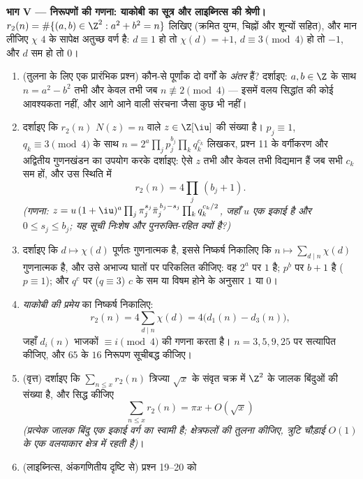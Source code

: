 \begin{problem}[{सप्ताहांत समस्या --- दो वर्गों के योग, $\Z[\iu]$ के
माध्यम से}]
\medskip
\noindent\textbf{भाग V --- निरूपणों की गणना: याकोबी का सूत्र और
लाइब्नित्स की श्रेणी।} $r_2(n) = \#\{(a, b) \in
\Z^2 : a^2 + b^2 = n\}$ लिखिए (क्रमित युग्म, चिह्नों और
शून्यों सहित), और मान लीजिए $\chi$ $4$ के सापेक्ष अतुच्छ वर्ण
है: $d \equiv 1$ हो तो $\chi(d) = +1$, $d \equiv 3 \pmod4$ हो तो $-1$, और $d$ सम हो तो
$0$।
\begin{enumerate}[resume]
  \item (तुलना के लिए एक प्रारंभिक प्रश्न) कौन-से पूर्णांक दो
        वर्गों के \emph{अंतर} हैं? दर्शाइए: $a, b \in \Z$ के साथ $n = a^2 - b^2$
        तभी और केवल तभी जब $n \not\equiv 2 \pmod 4$ --- इसमें वलय सिद्धांत की कोई
        आवश्यकता नहीं, और आगे आने वाली संरचना जैसा कुछ भी नहीं।
  \item दर्शाइए कि $r_2(n)$ $N(z) = n$ वाले $z \in \Z[\iu]$ की संख्या है। $p_j \equiv 1$,
        $q_k \equiv 3
        \pmod4$ के साथ $n = 2^{a}\prod_jp_j^{b_j}
        \prod_kq_k^{c_k}$ लिखकर, प्रश्न 11 के वर्गीकरण और
        अद्वितीय गुणनखंडन का उपयोग करके दर्शाइए: ऐसे $z$ तभी
        और केवल तभी विद्यमान हैं जब सभी $c_k$ सम हों, और उस
        स्थिति में
        \[
        r_2(n) = 4\prod_j\,(b_j + 1) .
        \]
        \emph{(गणना: $z = u\,(1+\iu)^{a}\prod_j\pi_j^{s_j}
        \bar\pi_j^{\,b_j - s_j}\prod_kq_k^{c_k/2}$, जहाँ $u$ एक इकाई है और $0 \leq s_j \leq b_j$;
        यह सूची निःशेष और पुनरुक्ति-रहित क्यों है?)}
  \item दर्शाइए कि $d \mapsto \chi(d)$ पूर्णतः गुणनात्मक है, इससे निष्कर्ष
        निकालिए कि $n \mapsto
        \sum_{d \mid n}\chi(d)$ गुणनात्मक है, और उसे अभाज्य घातों पर
        परिकलित कीजिए: वह $2^a$ पर $1$ है; $p^b$ पर $b + 1$ है
        ($p \equiv 1$); और $q^c$ पर ($q \equiv 3$) $c$ के सम या विषम होने
        के अनुसार $1$ या $0$।
  \item \emph{याकोबी की प्रमेय} का निष्कर्ष निकालिए:
        \[
        r_2(n) = 4\sum_{d \mid n}\chi(d) =
        4\bigl(d_1(n) - d_3(n)\bigr),
        \]
        जहाँ $d_i(n)$ भाजकों $\equiv i \pmod 4$ की गणना करता है। $n = 3, 5, 9, 25$ पर
        सत्यापित कीजिए, और $65$ के $16$ निरूपण सूचीबद्ध
        कीजिए।
  \item (वृत्त) दर्शाइए कि $\sum_{n \leq x}r_2(n)$ त्रिज्या $\sqrt x$ के संवृत चक्र
        में $\Z^2$ के जालक बिंदुओं की संख्या है, और सिद्ध कीजिए
        \[
        \sum_{n\leq x}r_2(n) = \pi x + O(\sqrt x)
        \]
        \emph{(प्रत्येक जालक बिंदु एक इकाई वर्ग का स्वामी है;
        क्षेत्रफलों की तुलना कीजिए, त्रुटि चौड़ाई $O(1)$ के एक
        वलयाकार क्षेत्र में रहती है)}।
  \item (लाइब्नित्स, अंकगणितीय दृष्टि से) प्रश्न 19--20 को

\end{enumerate}
\end{problem}
